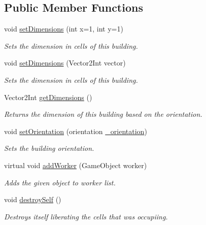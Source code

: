 \subsection*{Public Member Functions}
\begin{DoxyCompactItemize}
\item 
void \mbox{\hyperlink{class_building_ac06aa2a8d21f1594e8dda8d391297f8f}{set\+Dimensions}} (int x=1, int y=1)
\begin{DoxyCompactList}\small\item\em Sets the dimension in cells of this building. \end{DoxyCompactList}\item 
void \mbox{\hyperlink{class_building_abd37334947ced78272af09ff706b9944}{set\+Dimensions}} (Vector2\+Int vector)
\begin{DoxyCompactList}\small\item\em Sets the dimension in cells of this building. \end{DoxyCompactList}\item 
Vector2\+Int \mbox{\hyperlink{class_building_a79a7914069d3d2886512d22a02c5a328}{get\+Dimensions}} ()
\begin{DoxyCompactList}\small\item\em Returns the dimension of this building based on the orientation. \end{DoxyCompactList}\item 
void \mbox{\hyperlink{class_building_a60541ddc16e4c630a396b1f1ffbbbac6}{set\+Orientation}} (orientation \mbox{\hyperlink{class_building_af17fc4832a9e36f5ea3891f486138fc6}{\+\_\+orientation}})
\begin{DoxyCompactList}\small\item\em Sets the building orientation. \end{DoxyCompactList}\item 
virtual void \mbox{\hyperlink{class_building_a3ff7dbfd8b9062dced8438c2e83b2320}{add\+Worker}} (Game\+Object worker)
\begin{DoxyCompactList}\small\item\em Adds the given object to worker list. \end{DoxyCompactList}\item 
void \mbox{\hyperlink{class_building_abb43fc4e8f9666d50c67208886785ff3}{destroy\+Self}} ()
\begin{DoxyCompactList}\small\item\em Destroys itself liberating the cells that was occupiing. \end{DoxyCompactList}\item 

\end{DoxyCompactItemize}
